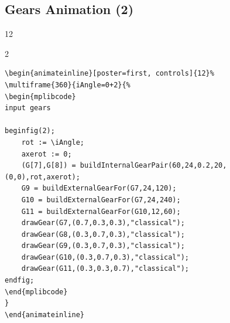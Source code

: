 \documentclass[english]{ltxdoc}
\begin{document}
\begin{landscape}
\subsection{Gears Animation (2)}

\begin{center}
\begin{animateinline}[poster=first, controls]{12}%
\end{animateinline}
\end{center}
\begin{multicols}{2}
  \begin{lstlisting}
\begin{animateinline}[poster=first, controls]{12}%
\multiframe{360}{iAngle=0+2}{%
\begin{mplibcode}
input gears

beginfig(2);
    rot := \iAngle; 
    axerot := 0;
    (G[7],G[8]) = buildInternalGearPair(60,24,0.2,20,(0,0),rot,axerot);
    G9 = buildExternalGearFor(G7,24,120);
    G10 = buildExternalGearFor(G7,24,240);
    G11 = buildExternalGearFor(G10,12,60);
    drawGear(G7,(0.7,0.3,0.3),"classical");
    drawGear(G8,(0.3,0.7,0.3),"classical");
    drawGear(G9,(0.3,0.7,0.3),"classical");
    drawGear(G10,(0.3,0.7,0.3),"classical");
    drawGear(G11,(0.3,0.3,0.7),"classical");
endfig;
\end{mplibcode}
}
\end{animateinline}
  \end{lstlisting}
\end{multicols}
\end{landscape}
\end{document}
